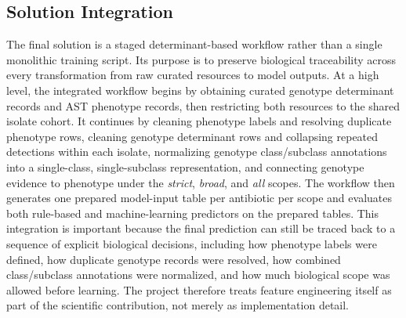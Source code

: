 \subsection{Solution Integration}

The final solution is a staged determinant-based workflow rather than a single monolithic training script. Its purpose is to preserve biological traceability across every transformation from raw curated resources to model outputs. At a high level, the integrated workflow begins by obtaining curated genotype determinant records and AST phenotype records, then restricting both resources to the shared isolate cohort. It continues by cleaning phenotype labels and resolving duplicate phenotype rows, cleaning genotype determinant rows and collapsing repeated detections within each isolate, normalizing genotype class/subclass annotations into a single-class, single-subclass representation, and connecting genotype evidence to phenotype under the \textit{strict}, \textit{broad}, and \textit{all} scopes. The workflow then generates one prepared model-input table per antibiotic per scope and evaluates both rule-based and machine-learning predictors on the prepared tables. This integration is important because the final prediction can still be traced back to a sequence of explicit biological decisions, including how phenotype labels were defined, how duplicate genotype records were resolved, how combined class/subclass annotations were normalized, and how much biological scope was allowed before learning. The project therefore treats feature engineering itself as part of the scientific contribution, not merely as implementation detail.
